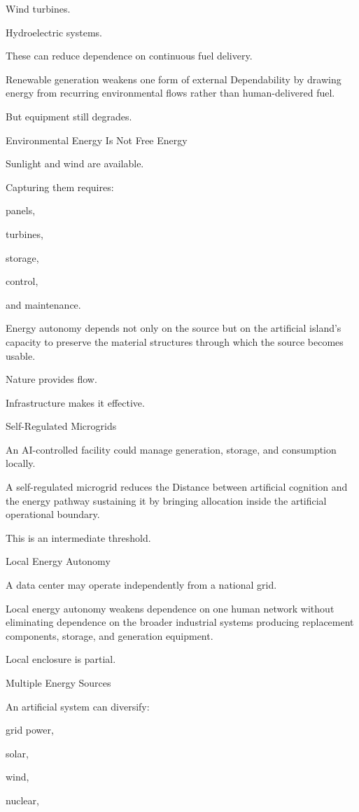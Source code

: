 Wind turbines.

Hydroelectric systems.

These can reduce dependence on continuous fuel delivery.

Renewable generation weakens one form of external Dependability by drawing energy from recurring environmental flows rather than human-delivered fuel.

But equipment still degrades.

Environmental Energy Is Not Free Energy

Sunlight and wind are available.

Capturing them requires:

panels,

turbines,

storage,

control,

and maintenance.

Energy autonomy depends not only on the source but on the artificial island’s capacity to preserve the material structures through which the source becomes usable.

Nature provides flow.

Infrastructure makes it effective.

Self-Regulated Microgrids

An AI-controlled facility could manage generation, storage, and consumption locally.

A self-regulated microgrid reduces the Distance between artificial cognition and the energy pathway sustaining it by bringing allocation inside the artificial operational boundary.

This is an intermediate threshold.

Local Energy Autonomy

A data center may operate independently from a national grid.

Local energy autonomy weakens dependence on one human network without eliminating dependence on the broader industrial systems producing replacement components, storage, and generation equipment.

Local enclosure is partial.

Multiple Energy Sources

An artificial system can diversify:

grid power,

solar,

wind,

nuclear,

